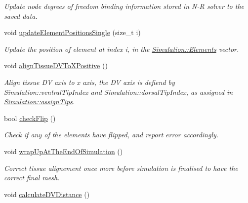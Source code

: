 \begin{DoxyCompactItemize}
\begin{DoxyCompactList}\small\item\em Update node degrees of freedom binding information stored in N-\/\+R solver to the saved data. \end{DoxyCompactList}\item 
\hypertarget{classSimulation_a4cfdafedfcaedb329c377046009bf7ec}{}void \hyperlink{classSimulation_a4cfdafedfcaedb329c377046009bf7ec}{update\+Element\+Positions\+Single} (size\+\_\+t i)\label{classSimulation_a4cfdafedfcaedb329c377046009bf7ec}

\begin{DoxyCompactList}\small\item\em Update the position of element at index i, in the \hyperlink{classSimulation_a96e0aaea7b40dbb5bc11329fc7d34559}{Simulation\+::\+Elements} vector. \end{DoxyCompactList}\item 
void \hyperlink{classSimulation_a91a12f6ac1b230cecbe004221326a7ca}{align\+Tissue\+D\+V\+To\+X\+Positive} ()
\begin{DoxyCompactList}\small\item\em Align tissue D\+V axis to x axis, the D\+V axis is defiend by Simulation\+::ventral\+Tip\+Index and Simulation\+::dorsal\+Tip\+Index, as assigned in \hyperlink{classSimulation_a7ed75e3d044166072754e6e323f3604c}{Simulation\+::assign\+Tips}. \end{DoxyCompactList}\item 
\hypertarget{classSimulation_a7aa2db4c2819e37c0ded181d47467233}{}bool \hyperlink{classSimulation_a7aa2db4c2819e37c0ded181d47467233}{check\+Flip} ()\label{classSimulation_a7aa2db4c2819e37c0ded181d47467233}

\begin{DoxyCompactList}\small\item\em Check if any of the elements have flipped, and report error accordingly. \end{DoxyCompactList}\item 
\hypertarget{classSimulation_ada1776f97a899b0e77e20df658713cb3}{}void \hyperlink{classSimulation_ada1776f97a899b0e77e20df658713cb3}{wrap\+Up\+At\+The\+End\+Of\+Simulation} ()\label{classSimulation_ada1776f97a899b0e77e20df658713cb3}

\begin{DoxyCompactList}\small\item\em Correct tissue alignement once more before simulation is finalised to have the correct final mesh. \end{DoxyCompactList}\item 
\hypertarget{classSimulation_a2cdf77d01390a32cabb8ba7535a9f7dd}{}void \hyperlink{classSimulation_a2cdf77d01390a32cabb8ba7535a9f7dd}{calculate\+D\+V\+Distance} ()\label{classSimulation_a2cdf77d01390a32cabb8ba7535a9f7dd}


\end{DoxyCompactItemize}
